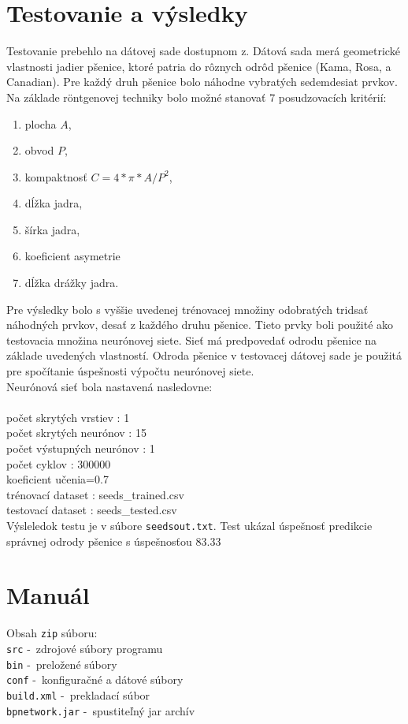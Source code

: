 \documentclass[a4paper, 11pt]{article}
\begin{document}
\section{Testovanie a výsledky}
\label{testavys}
Testovanie prebehlo na dátovej sade dostupnom z. Dátová sada merá geometrické vlastnosti jadier pšenice, ktoré patria do rôznych odrôd pšenice (Kama, Rosa, a Canadian). Pre každý druh pšenice bolo náhodne vybratých sedemdesiat prvkov. Na základe röntgenovej techniky bolo možné stanovať 7 posudzovacích kritérií: \\
\begin{enumerate}
\item plocha $A$, 
\item obvod $P$, 
\item kompaktnosť $C = 4*\pi*A/P^2$, 
\item dĺžka jadra,
\item šírka jadra, 
\item koeficient asymetrie
\item dĺžka drážky jadra. 
\end{enumerate}

Pre výsledky bolo s vyššie uvedenej trénovacej množiny odobratých tridsať náhodných prvkov, desať z každého druhu pšenice. Tieto prvky boli použité ako testovacia množina neurónovej siete. Sieť má predpovedať odrodu pšenice na základe uvedených vlastností. Odroda pšenice v testovacej dátovej sade je použitá pre spočítanie úspešnosti výpočtu neurónovej siete.   \\
Neurónová sieť bola nastavená nasledovne:\\
\\
počet skrytých vrstiev : 1\\
počet skrytých neurónov : 15\\
počet výstupných neurónov  : 1\\
počet cyklov  : 300000\\
koeficient učenia=0.7\\
trénovací dataset : seeds\_trained.csv \\
testovací dataset : seeds\_tested.csv \\

Výsleledok testu je v súbore \texttt{seedsout.txt}. Test ukázal úspešnosť predikcie správnej odrody pšenice s úspešnosťou 83.33%


\section{Manuál}
Obsah \texttt{zip} súboru:\\
\texttt{src} \--\ zdrojové súbory programu\\
\texttt{bin} \--\ preložené súbory\\
\texttt{conf} \--\ konfiguračné a dátové súbory\\
\texttt{build.xml} \--\ prekladací súbor\\
\texttt{bpnetwork.jar} \--\ spustiteľný jar archív\\
\end{document}
